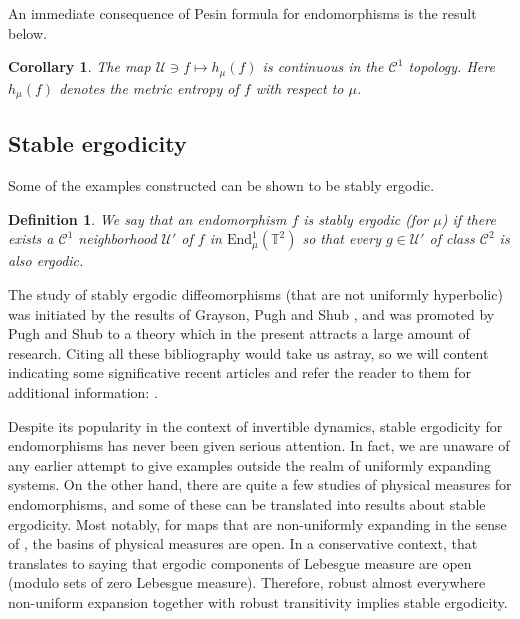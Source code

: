\documentclass[11pt,letterpaper,reqno]{article}
\newtheorem{corollary}{Corollary}[section]
\newtheorem{definition}{Definition}[section]
\newcommand{\TT}{\mathbb{T}^2}
\begin{document}
 An immediate consequence of Pesin formula for endomorphisms \cite{pesinendo} is the result below.
 
 \begin{corollary}
The map $\mathcal U\ni f\mapsto h_{\mu}(f)$ is continuous in the $\mathcal C^1$ topology. Here $h_{\mu}(f)$ denotes the metric entropy of $f$ with respect to $\mu$.
  \end{corollary}
 

 
 

\subsection{Stable ergodicity} %
\label{sub:stable_ergodicity}


Some of the examples constructed can be shown to be stably ergodic.

\begin{definition}
We say that an endomorphism $f$ is stably ergodic (for $\mu$) if there exists a $\mathcal C^1$ neighborhood $\mathcal U'$ of $f$ in $\mathrm{End}^1_{\mu}(\TT)$ so that every $g\in \mathcal{U'}$ of class $\mathcal{C}^{2}$ is also ergodic.
\end{definition}

The study of stably ergodic diffeomorphisms (that are not uniformly hyperbolic) was initiated by the results of Grayson, Pugh and Shub \cite{StErgGeo}, and was promoted by Pugh and Shub to a theory which in the present attracts a large amount of research. Citing all these bibliography would take us astray, so we will content indicating some significative recent articles and refer the reader to them for additional information: \cite{ErgPH,AccStaErg,Avila2021}.



Despite its popularity in the context of invertible dynamics, stable ergodicity for endomorphisms has never been given serious attention. In fact, we are unaware of any earlier attempt to give examples outside the realm of uniformly expanding systems. On the other hand, there are quite a few studies of physical measures for endomorphisms, and some of these can be translated into results about stable ergodicity. Most notably, for maps that are non-uniformly expanding in the sense of \cite{SRBMostexp}, the basins of physical measures are open. In a conservative context, that translates to saying that ergodic components of Lebesgue measure are open (modulo sets of zero Lebesgue measure). Therefore, robust almost everywhere non-uniform expansion together with robust transitivity implies stable ergodicity. 
\end{document}
